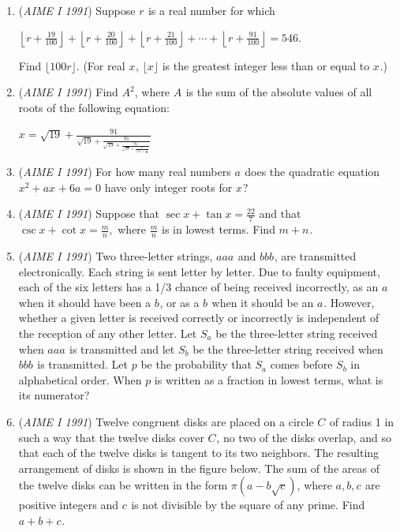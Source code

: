 \begin{enumerate}
 

	\item (\textit{AIME I 1991}) Suppose $r^{}_{}$ is a real number for which


 $\left\lfloor r + \frac{19}{100} \right\rfloor + \left\lfloor r + \frac{20}{100} \right\rfloor + \left\lfloor r + \frac{21}{100} \right\rfloor + \cdots + \left\lfloor r + \frac{91}{100} \right\rfloor = 546.$

 Find $\lfloor 100r \rfloor$. (For real $x^{}_{}$, $\lfloor x \rfloor$ is the greatest integer less than or equal to $x^{}_{}$.)


 

	\item (\textit{AIME I 1991}) Find $A^2_{}$, where $A^{}_{}$ is the sum of the absolute values of all roots of the following equation:


 $x = \sqrt{19} + \frac{91}{{\sqrt{19}+\frac{91}{{\sqrt{19}+\frac{91}{{\sqrt{19}+\frac{91}{{\sqrt{19}+\frac{91}{x}}}}}}}}}$


	\item (\textit{AIME I 1991}) For how many real numbers $a^{}_{}$ does the quadratic equation $x^2 + ax^{}_{} + 6a=0$ have only integer roots for $x^{}_{}$?


 

	\item (\textit{AIME I 1991}) Suppose that $\sec x+\tan x=\frac{22}7$ and that $\csc x+\cot x=\frac mn,$ where $\frac mn$ is in lowest terms.  Find $m+n^{}_{}.$


	\item (\textit{AIME I 1991}) Two three-letter strings, $aaa^{}_{}$ and $bbb^{}_{}$, are transmitted electronically. Each string is sent letter by letter. Due to faulty equipment, each of the six letters has a 1/3 chance of being received incorrectly, as an $a^{}_{}$ when it should have been a $b^{}_{}$, or as a $b^{}_{}$ when it should be an $a^{}_{}$. However, whether a given letter is received correctly or incorrectly is independent of the reception of any other letter. Let $S_a^{}$ be the three-letter string received when $aaa^{}_{}$ is transmitted and let $S_b^{}$ be the three-letter string received when $bbb^{}_{}$ is transmitted. Let $p$ be the probability that $S_a^{}$ comes before $S_b^{}$ in alphabetical order. When $p$ is written as a fraction in lowest terms, what is its numerator?


 

	\item (\textit{AIME I 1991}) Twelve congruent disks are placed on a circle $C^{}_{}$ of radius 1 in such a way that the twelve disks cover $C^{}_{}$, no two of the disks overlap, and so that each of the twelve disks is tangent to its two neighbors. The resulting arrangement of disks is shown in the figure below.  The sum of the areas of the twelve disks can be written in the form $\pi(a-b\sqrt{c})$, where $a,b,c^{}_{}$ are positive integers and $c^{}_{}$ is not divisible by the square of any prime. Find $a+b+c^{}_{}$.



\end{enumerate}
